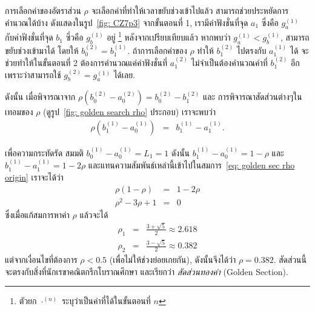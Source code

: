 การเลือกค่าของอัตราส่วน $\rho$ จะเลือกค่าที่ทำให้เวลาขยับช่วงเข้าไปแล้ว สามารถช่วยประหยัดการคำนวณได้บ้าง ดังแสดงในรูป~\ref{fig: CZ7p3}
จากขั้นตอนที่ 1, เรามีค่าฟังชั่นที่จุด $a_1$ ซึ่งคือ $g_a^{(1)}$ กับค่าฟังชั่นที่จุด $b_1$ ซึ่วคือ $g_b^{(1)}$ อยู่%
\footnote{ตัวยก $\cdot^{(n)}$ ระบุว่าเป็นค่าที่ได้ในขั้นตอนที่ $n$}
หลังจากเปรียบเทียบแล้ว หากพบว่า $g_a^{(1)} < g_b^{(1)}$, สามารถขยับช่วงเข้ามาได้ 
โดยให้ $b_0^{(2)} = b_1^{(1)}$.
ถ้าการเลือกค่าของ $\rho$ ทำให้ $b_1^{(2)}$ ไปตรงกับ $a_1^{(1)}$ ได้ จะช่วยทำให้ในขั้นตอนที่ 2 ต้องการคำนวณแค่ค่าฟังชั่นที่ $a_1^{(2)}$ ไม่จำเป็นต้องคำนวณค่าที่ $b_1^{(2)}$ อีก เพราะว่าสามารถใช้ $g_b^{(2)} = g_a^{(1)}$ ได้เลย.

ดังนั้น เมื่อพิจารณาจาก $\rho (b_0^{(2)} - a_0^{(2)}) = b_0^{(2)} - b_1^{(2)}$ และ การพิจารณาสัดส่วนต่างๆในเทอมของ $\rho$ (ดูรูป~\ref{fig: golden search rho} ประกอบ) เราจะพบว่า
\begin{eqnarray}
  \rho (b_1^{(1)} - a_0^{(1)}) &=& b_1^{(1)} - a_1^{(1)}.
\label{eq: golden sec rho origin} 
\end{eqnarray}

เพื่อความกระทัดรัด สมมติ $b_0^{(1)} - a_0^{(1)} = L_1 = 1$
ดังนั้น $b_1^{(1)} - a_0^{(1)} = 1 - \rho$ และ $b_1^{(1)} - a_1^{(1)} = 1 - 2 \rho$
และแทนความสัมพันธ์เหล่านี้เข้าไปในสมการ~\ref{eq: golden sec rho origin} เราจะได้ว่า
\begin{eqnarray}
   \rho (1 - \rho) &=& 1 - 2 \rho
\nonumber \\
   \rho^2 - 3 \rho + 1 &=& 0
\nonumber
\end{eqnarray}
ซึ่งเมื่อแก้สมการหาค่า $\rho$ แล้วจะได้
\begin{eqnarray}
   \rho_1 &=& \frac{3 + \sqrt{5}}{2} \approx 2.618
\nonumber \\   
   \rho_2 &=& \frac{3 - \sqrt{5}}{2} \approx 0.382
\end{eqnarray}
แต่จากเงื่อนไขที่ต้องการ $\rho < 0.5$ (เพื่อไม่ให้ช่วงย่อยเกยกัน), 
ดังนั้นจึงได้ว่า $\rho = 0.382$.
สัดส่วนนี้จะตรงกับสิ่งที่นักเรขาคณิตกรีกโบราณศึกษา และเรียกว่า \textit{สัดส่วนทองคำ} (Golden Section).

